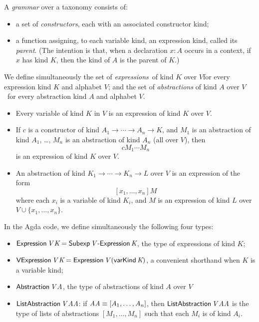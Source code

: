 \documentclass[envcountsame]{llncs}
\begin{document}

A \emph{grammar} over a taxonomy consists of:
\begin{itemize}
\item
a set of \emph{constructors}, each with an associated constructor kind;
\item
a function assigning, to each variable kind, an expression kind, called its \emph{parent}.  (The intention is that, when a declaration $x : A$ occurs in a context, if $x$ has kind $K$, then the kind of $A$ is the parent of $K$.)
\end{itemize}


\begin{definition}
 We define simultaneously the set of \emph{expressions} of kind $K$ over $V$for every expression kind $K$ and
alphabet $V$;
and the set of \emph{abstractions} of kind $A$ over $V$ for every abstraction kind $A$ and alphabet
$V$.
\begin{itemize}
\item Every variable of kind $K$ in $V$ is an expression of kind $K$ over $V$.
\item If $c$ is a constructor of kind $A_1 \rightarrow \cdots \rightarrow A_n \rightarrow K$,
and $M_1$ is an abstraction of kind $A_1$, \ldots, $M_n$ is an abstraction of kind $A_n$ (all over $V$), then
$$ c M_1 \cdots M_n $$
is an expression of kind $K$ over $V$.
\item
An abstraction of kind $K_1 \rightarrow \cdots \rightarrow K_n \rightarrow L$ over $V$ is
an expression of the form
\[ [x_1, \ldots, x_n] M \]
where each $x_i$ is a variable of kind $K_i$, and $M$ is an expression of kind $L$ over
$V \cup \{ x_1, \ldots, x_n \}$.
\end{itemize}
\end{definition}

In the Agda code, we define simultaneously the following four types:
\begin{itemize}
 \item $\AgdaFunction{Expression} \, \AgdaBound{V} \, \AgdaBound{K} = \AgdaDatatype{Subexp} \, \AgdaBound{V} \, \AgdaInductiveConstructor{-Expression} \, \AgdaBound{K}$,
the type of expressions of kind $K$;
\item $\AgdaFunction{VExpression} \, \AgdaBound{V} \, \AgdaBound{K} = \AgdaFunction{Expression} \,
\AgdaBound{V} \, (\AgdaInductiveConstructor{varKind} \, \AgdaBound{K})$, a convenient
shorthand when $K$ is a variable kind;
\item $\AgdaFunction{Abstraction} \, \AgdaBound{V} \, \AgdaBound{A}$, the type of abstractions
of kind $A$ over $V$
\item $\AgdaFunction{ListAbstraction} \, \AgdaBound{V} \, \AgdaBound{AA}$: if $\AgdaBound{AA} \equiv [ A_1, \ldots, A_n ]$,
then $\AgdaFunction{ListAbstraction} \, \AgdaBound{V} \, \AgdaBound{AA}$ is the type of lists of abstractions $[M_1, \ldots, M_n]$
such that each $M_i$ is of kind $A_i$.
\end{itemize}
\end{document}
